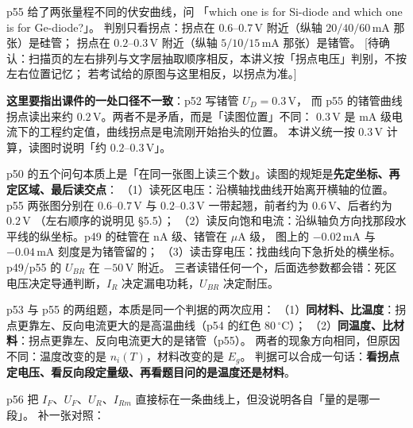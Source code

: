 \documentclass[11pt]{ctexart}
\begin{document}

p55 给了两张量程不同的伏安曲线，问 「which one is for Si-diode and which one is for Ge-diode?」。
判别只看拐点：拐点在 $0.6$--$0.7\,\mathrm{V}$ 附近（纵轴 $20/40/60\,\mathrm{mA}$ 那张）是硅管；
拐点在 $0.2$--$0.3\,\mathrm{V}$ 附近（纵轴 $5/10/15\,\mathrm{mA}$ 那张）是锗管。
[待确认：扫描页的左右排列与文字层抽取顺序相反，本讲义按「拐点电压」判别，不按左右位置记忆；
若考试给的原图与这里相反，以拐点为准。]

\textbf{这里要指出课件的一处口径不一致}：p52 写锗管 $U_D=0.3\,\mathrm{V}$，
而 p55 的锗管曲线拐点读出来约 $0.2\,\mathrm{V}$。两者不是矛盾，而是「读图位置」不同：
$0.3\,\mathrm{V}$ 是 mA 级电流下的工程约定值，曲线拐点是电流刚开始抬头的位置。
本讲义统一按 $0.3\,\mathrm{V}$ 计算，读图时说明「约 $0.2$--$0.3\,\mathrm{V}$」。


p50 的五个问句本质上是「在同一张图上读三个数」。读图的规矩是\textbf{先定坐标、再定区域、最后读交点}：
（1）读死区电压：沿横轴找曲线开始离开横轴的位置。p55 两张图分别在 $0.6$--$0.7\,\mathrm{V}$ 与
$0.2$--$0.3\,\mathrm{V}$ 一带起翘，前者约为 $0.6\,\mathrm{V}$、后者约为 $0.2\,\mathrm{V}$
（左右顺序的说明见 §5.5）；
（2）读反向饱和电流：沿纵轴负方向找那段水平线的纵坐标。p49 的硅管在 $\mathrm{nA}$ 级、锗管在 $\mu\mathrm{A}$ 级，
图上的 $-0.02\,\mathrm{mA}$ 与 $-0.04\,\mathrm{mA}$ 刻度是为锗管留的；
（3）读击穿电压：找曲线向下急折处的横坐标。p49/p55 的 $U_{BR}$ 在 $-50\,\mathrm{V}$ 附近。
三者读错任何一个，后面选参数都会错：死区电压决定导通判断，$I_R$ 决定漏电功耗，$U_{BR}$ 决定耐压。


p53 与 p55 的两组题，本质是同一个判据的两次应用：
（1）\textbf{同材料、比温度}：拐点更靠左、反向电流更大的是高温曲线（p54 的红色 $80\,{}^\circ\mathrm{C}$）；
（2）\textbf{同温度、比材料}：拐点更靠左、反向电流更大的是锗管（p55）。
两者的现象方向相同，但原因不同：温度改变的是 $n_i(T)$，材料改变的是 $E_g$。
判据可以合成一句话：\textbf{看拐点定电压、看反向段定量级、再看题目问的是温度还是材料}。


p56 把 $I_F$、$U_F$、$U_R$、$I_{Rm}$ 直接标在一条曲线上，但没说明各自「量的是哪一段」。
补一张对照：
\end{document}
